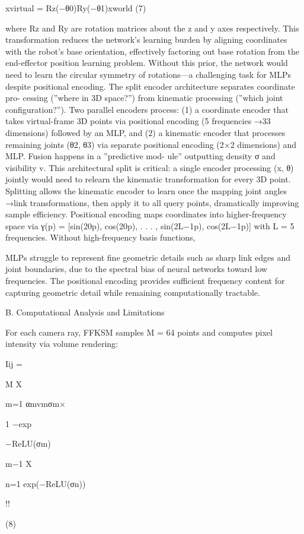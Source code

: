 \documentclass[10pt,twocolumn,letterpaper]{article}
\begin{document}
xvirtual = Rz(−θ0)Ry(−θ1)xworld (7)

where Rz and Ry are rotation matrices about the z and y axes respectively. This transformation reduces the network’s learning burden by aligning coordinates with the robot’s base orientation, effectively factoring out base rotation from the end-effector position learning problem. Without this prior, the network would need to learn the circular symmetry of rotations—a challenging task for MLPs despite positional encoding. The split encoder architecture separates coordinate pro- cessing (”where in 3D space?”) from kinematic processing (”which joint configuration?”). Two parallel encoders process: (1) a coordinate encoder that takes virtual-frame 3D points via positional encoding (5 frequencies →33 dimensions) followed by an MLP, and (2) a kinematic encoder that processes remaining joints (θ2, θ3) via separate positional encoding (2×2 dimensions) and MLP. Fusion happens in a ”predictive mod- ule” outputting density σ and visibility v. This architectural split is critical: a single encoder processing (x, θ) jointly would need to relearn the kinematic transformation for every 3D point. Splitting allows the kinematic encoder to learn once the mapping joint angles →link transformations, then apply it to all query points, dramatically improving sample efficiency. Positional encoding maps coordinates into higher-frequency space via γ(p) = [sin(20p), cos(20p), . . . , sin(2L−1p), cos(2L−1p)] with L = 5 frequencies. Without high-frequency basis functions,

MLPs struggle to represent fine geometric details such as sharp link edges and joint boundaries, due to the spectral bias of neural networks toward low frequencies. The positional encoding provides sufficient frequency content for capturing geometric detail while remaining computationally tractable.

B. Computational Analysis and Limitations

For each camera ray, FFKSM samples M = 64 points and computes pixel intensity via volume rendering:

Iij =

M X

m=1 αmvmσm×

1 −exp

−ReLU(σm)

m−1 X

n=1 exp(−ReLU(σn))

!!

(8)
\end{document}

